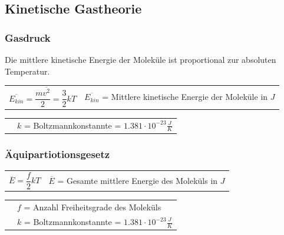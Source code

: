 	\subsection{Kinetische Gastheorie}
		\begin{minipage}[t]{15cm}
			\subsubsection{Gasdruck}
				Die mittlere kinetische Energie der Moleküle ist proportional zur absoluten Temperatur.
				\newline
				\newline
				\renewcommand{\arraystretch}{2.5}
				\begin{tabular}{ p{4cm} | p{10cm}}
					$\overline{E_{kin}} = \dfrac{m\overline{v^2}}{2} = \dfrac{3}{2}kT$	&	$\overline{E_{kin}}$ = Mittlere kinetische Energie der Moleküle in $J$\\
				\end{tabular}
				\renewcommand{\arraystretch}{1.5}
				\begin{tabular}{ p{4cm} | p{7cm} }
					& $k$ = Boltzmannkonstannte =  $1.381 \cdot 10^{-23} \frac{J}{K}$\\
				\end{tabular} 
				\renewcommand{\arraystretch}{1}
		\end{minipage}
		\newline
		\newline
		\newline
		\newline
		\begin{minipage}[t]{10cm}
			\subsubsection{Äquipartiotionsgesetz}
				\renewcommand{\arraystretch}{2.5}
				\begin{tabular}{ p{2cm} | p{7cm}}
					$\overline{E} = \dfrac{f}{2}kT$	&	$\overline{E}$ = Gesamte mittlere Energie des Moleküls in $J$\\
				\end{tabular}
				\renewcommand{\arraystretch}{1.5}
				\begin{tabular}{ p{2cm} | p{7cm} }
					& $f$ = Anzahl Freiheitsgrade des Moleküls\\
					& $k$ = Boltzmannkonstannte =  $1.381 \cdot 10^{-23} \frac{J}{K}$\\
				\end{tabular} 
				\renewcommand{\arraystretch}{1}
		\end{minipage}
